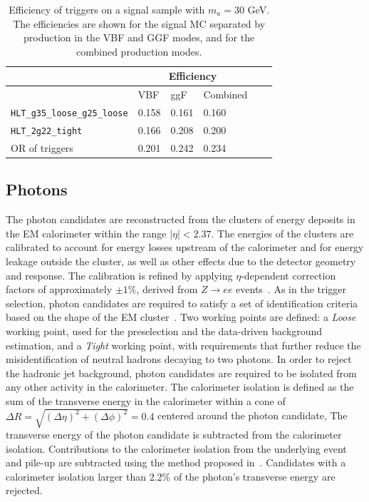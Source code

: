 \begin{table}[]
\centering
  \caption{Efficiency of triggers on a signal sample with $m_a=30$ GeV. The efficiencies are shown for the signal MC separated by production in the VBF and GGF modes, and for the combined production modes.}
\label{tab:HBSM:trigeff}
\begin{tabular}{|l|l|l|l|l|l|}
\hline
                                                      & \multicolumn{3}{c|}{Efficiency}  \\ \hline
                                                      & VBF      & ggF  & Combined   \\ \hline
\texttt{HLT\_g35\_loose\_g25\_loose}                  & 0.158  & 0.161 & 0.160\\ \hline
\texttt{HLT\_2g22\_tight}                             & 0.166  & 0.208 & 0.200\\ \hline
OR of triggers                                        & 0.201  & 0.242 & 0.234\\ \hline
\end{tabular}
\end{table}

\subsection{Photons}
\label{sec:HBSM:photons}
The photon candidates are reconstructed from the clusters of energy deposits in the EM calorimeter within the range $|\eta|<2.37$.
The energies of the clusters are calibrated to account for energy losses upstream of the calorimeter and for energy leakage outside the cluster, as well as other effects due to the detector geometry and response.
The calibration is refined by applying $\eta$-dependent correction factors of approximately $\pm1$\%, derived from $Z\to ee$ events~\cite{PERF-2013-05}.
As in the trigger selection, photon candidates are required to satisfy a set of identification criteria based on the shape of the EM cluster~\cite{PERF-2013-04}.
Two working points are defined: a \textit{Loose} working point, used for the preselection and the data-driven background estimation, and a 
\textit{Tight} working point, with requirements that further reduce the misidentification of neutral hadrons decaying to two photons.
In order to reject the hadronic jet background, photon candidates are required to be isolated from any other activity in the calorimeter.
The calorimeter isolation is defined as the sum of the transverse energy in the
calorimeter within a cone of \mbox{$\Delta R = \sqrt{(\Delta\eta)^2+(\Delta\phi)^2}=0.4$} centered around the photon candidate,
The transverse energy of the photon candidate is subtracted from the calorimeter isolation.
Contributions to the calorimeter isolation from the underlying event and pile-up are subtracted using the method proposed in~\cite{Cacciari:2007fd}.
Candidates with a calorimeter isolation larger than 2.2\% of the photon's transverse energy are rejected.

